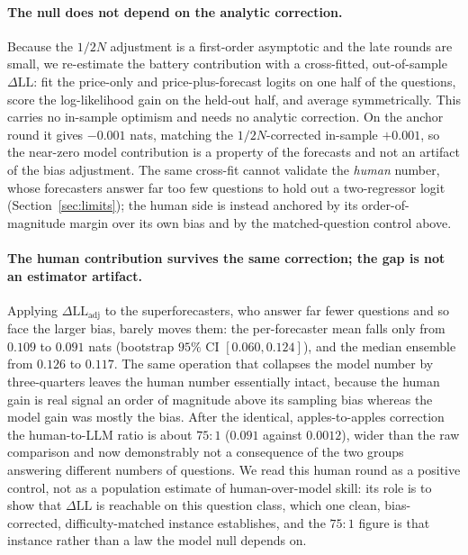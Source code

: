 \documentclass[11pt]{article}
\begin{document}
\paragraph{The null does not depend on the analytic correction.} Because the $1/2N$ adjustment is a first-order asymptotic and the late rounds are small, we re-estimate the battery contribution with a cross-fitted, out-of-sample $\Delta\mathrm{LL}$: fit the price-only and price-plus-forecast logits on one half of the questions, score the log-likelihood gain on the held-out half, and average symmetrically. This carries no in-sample optimism and needs no analytic correction. On the anchor round it gives $-0.001$ nats, matching the $1/2N$-corrected in-sample $+0.001$, so the near-zero model contribution is a property of the forecasts and not an artifact of the bias adjustment. The same cross-fit cannot validate the \emph{human} number, whose forecasters answer far too few questions to hold out a two-regressor logit (Section~\ref{sec:limits}); the human side is instead anchored by its order-of-magnitude margin over its own bias and by the matched-question control above.

\paragraph{The human contribution survives the same correction; the gap is not an estimator artifact.} Applying $\Delta\mathrm{LL}_{\mathrm{adj}}$ to the superforecasters, who answer far fewer questions and so face the larger bias, barely moves them: the per-forecaster mean falls only from $0.109$ to $0.091$ nats (bootstrap $95\%$ CI $[0.060,0.124]$), and the median ensemble from $0.126$ to $0.117$. The same operation that collapses the model number by three-quarters leaves the human number essentially intact, because the human gain is real signal an order of magnitude above its sampling bias whereas the model gain was mostly the bias. After the identical, apples-to-apples correction the human-to-LLM ratio is about $75\!:\!1$ ($0.091$ against $0.0012$), wider than the raw comparison and now demonstrably not a consequence of the two groups answering different numbers of questions. We read this human round as a positive control, not as a population estimate of human-over-model skill: its role is to show that $\Delta\mathrm{LL}$ is reachable on this question class, which one clean, bias-corrected, difficulty-matched instance establishes, and the $75\!:\!1$ figure is that instance rather than a law the model null depends on.
\end{document}
